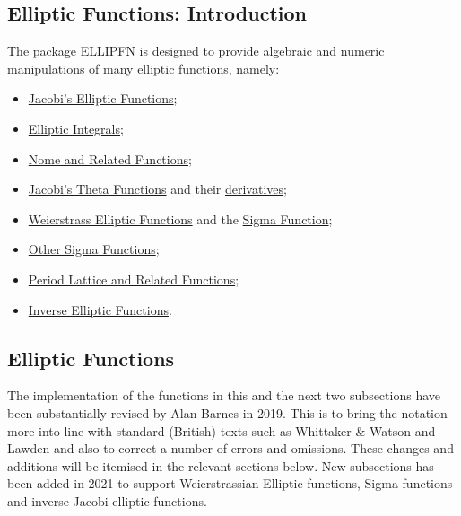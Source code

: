 \subsection{Elliptic Functions: Introduction}
\hypertarget{ELLIPFNS}{}
\ifdefined{}\fi
%
The package ELLIPFN is designed to provide algebraic and numeric manipulations of
many elliptic functions, namely:

\begin{itemize}
\item \hyperlink{JACEF}{Jacobi's Elliptic Functions};
\item \hyperlink{ELLIPI}{Elliptic Integrals};
\item \hyperlink{ELLIPNOME}{Nome and Related Functions};
\item \hyperlink{JACTF}{Jacobi's Theta Functions} and their
\hyperlink{THETAD}{ derivatives};
\item \hyperlink{WEIERSTRASS}{Weierstrass Elliptic Functions} and the
\hyperlink{SIGMA}{Sigma Function};
\item \hyperlink{SIGMA1}{Other Sigma Functions};
\item \hyperlink{ETA}{Period Lattice and Related Functions};
\item \hyperlink{INVELL}{Inverse Elliptic Functions}.
\end{itemize}

\subsection{Elliptic Functions}
The implementation of the functions in this and the next two subsections have
been substantially revised by Alan Barnes in 2019. This is to bring the
notation more into line with standard (British) texts such as Whittaker
\& Watson \cite{WhittakerWatson:69} and Lawden \cite{Lawden:89} and also to correct
a number of errors and omissions. These changes and additions will be itemised in the relevant
sections below.  New subsections has been added in 2021 to support  Weierstrassian Elliptic
functions, Sigma functions and inverse Jacobi elliptic functions.

